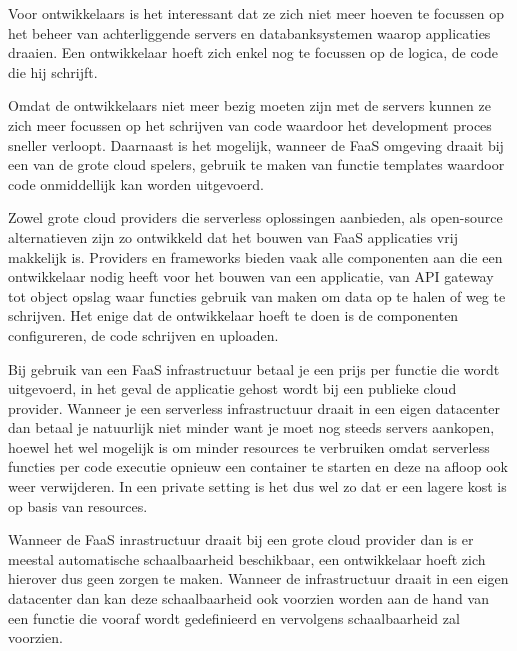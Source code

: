 \begin{description}[style=unboxed, labelwidth=\linewidth, listparindent =0pt]
    \item[Geen beheer van infrastructuur]
    Voor ontwikkelaars is het interessant dat ze zich niet meer hoeven te focussen op het beheer van achterliggende servers en databanksystemen waarop applicaties draaien. Een ontwikkelaar hoeft zich enkel nog te focussen op de logica, de code die hij schrijft.
    \newline
    
    \item [Snellere development en deployment]
    Omdat de ontwikkelaars niet meer bezig moeten zijn met de servers kunnen ze zich meer focussen op het schrijven van code waardoor het development proces sneller verloopt. Daarnaast is het mogelijk, wanneer de FaaS omgeving draait bij een van de grote cloud spelers, gebruik te maken van functie templates waardoor code onmiddellijk kan worden uitgevoerd.
    
    \item [Makkelijk in gebruik]
    Zowel grote cloud providers die serverless oplossingen aanbieden, als open-source alternatieven zijn zo ontwikkeld dat het bouwen van FaaS applicaties vrij makkelijk is. Providers en frameworks bieden vaak alle componenten aan die een ontwikkelaar nodig heeft voor het bouwen van een applicatie, van API gateway tot object opslag waar functies gebruik van maken om data op te halen of weg te schrijven. Het enige dat de ontwikkelaar hoeft te doen is de componenten configureren, de code schrijven en uploaden.
    \newline
    
    \item [Lagere kosten]
    Bij gebruik van een FaaS infrastructuur betaal je een prijs per functie die wordt uitgevoerd, in het geval de applicatie gehost wordt bij een publieke cloud provider. Wanneer je een serverless infrastructuur draait in een eigen datacenter dan betaal je natuurlijk niet minder want je moet nog steeds servers aankopen, hoewel het wel mogelijk is om minder resources te verbruiken omdat serverless functies per code executie opnieuw een container te starten en deze na afloop ook weer verwijderen. In een private setting is het dus wel zo dat er een lagere kost is op basis van resources.
    \newline
    
     \item [Verbeterde schaalbaarheid]
     Wanneer de FaaS inrastructuur draait bij een grote cloud provider dan is er meestal automatische schaalbaarheid beschikbaar, een ontwikkelaar hoeft zich hierover dus geen zorgen te maken. Wanneer de infrastructuur draait in een eigen datacenter dan kan deze schaalbaarheid ook voorzien worden aan de hand van een functie die vooraf wordt gedefinieerd en vervolgens schaalbaarheid zal voorzien.
     \newline 
\end{description}

